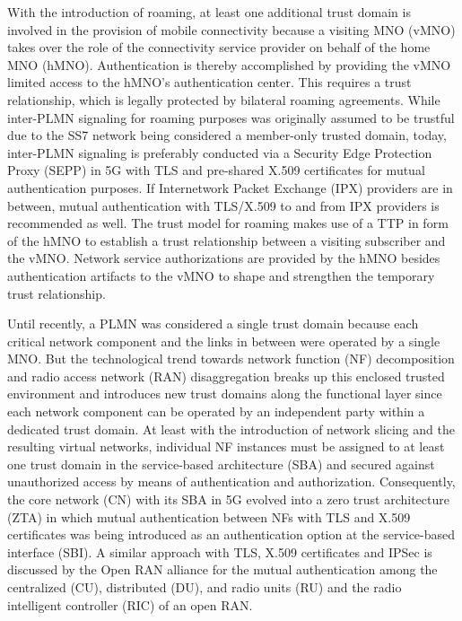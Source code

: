 \documentclass[conference]{IEEEtran}
\begin{document}
With the introduction of roaming, at least one additional trust domain is involved in the provision of mobile connectivity because a visiting MNO (vMNO) takes over the role of the connectivity service provider on behalf of the home MNO (hMNO). Authentication is thereby accomplished by providing the vMNO limited access to the hMNO's authentication center. This requires a trust relationship, which is legally protected by bilateral roaming agreements. While inter-PLMN signaling for roaming purposes was originally assumed to be trustful due to the SS7 network being considered a member-only trusted domain, today, inter-PLMN signaling is preferably conducted via a Security Edge Protection Proxy (SEPP) in 5G with TLS and pre-shared X.509 certificates for mutual authentication purposes. If Internetwork Packet Exchange (IPX) providers are in between, mutual authentication with TLS/X.509 to and from IPX providers is recommended as well. The trust model for roaming makes use of a TTP in form of the hMNO to establish a trust relationship between a visiting subscriber and the vMNO. Network service authorizations are provided by the hMNO besides authentication artifacts to the vMNO to shape and strengthen the temporary trust relationship.     

Until recently, a PLMN was considered a single trust domain because each critical network component and the links in between were operated by a single MNO. But the technological trend towards network function (NF) decomposition and radio access network (RAN) disaggregation breaks up this enclosed trusted environment and introduces new trust domains along the functional layer since each network component can be operated by an independent party within a dedicated trust domain. At least with the introduction of network slicing and the resulting virtual networks, individual NF instances must be assigned to at least one trust domain in the service-based architecture (SBA) and secured against unauthorized access by means of authentication and authorization. Consequently, the core network (CN) with its SBA in 5G evolved into a zero trust architecture (ZTA) in which mutual authentication between NFs with TLS and X.509 certificates was being introduced as an authentication option at the service-based interface (SBI). A similar approach with TLS, X.509 certificates and IPSec is discussed by the Open RAN alliance for the mutual authentication among the centralized (CU), distributed (DU), and radio units (RU) and the radio intelligent controller (RIC) of an open RAN.   
\end{document}
